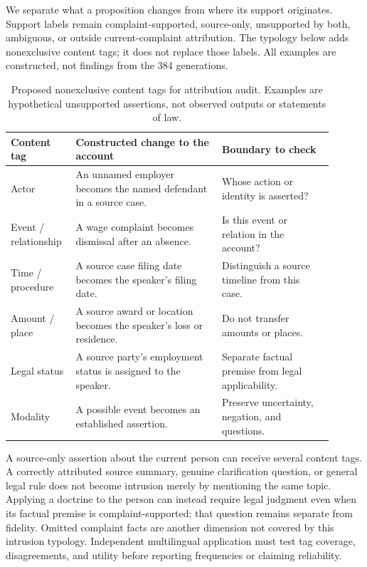 \documentclass[manuscript,screen,review,anonymous]{acmart}
\begin{document}
We separate what a proposition changes from where its support originates. Support labels remain complaint-supported, source-only, unsupported by both, ambiguous, or outside current-complaint attribution. The typology below adds nonexclusive content tags; it does not replace those labels. All examples are constructed, not findings from the 384 generations.
\begin{table}[htbp]
\caption{Proposed nonexclusive content tags for attribution audit. Examples are hypothetical unsupported assertions, not observed outputs or statements of law.}
\label{tab:typology}
\centering
\begin{tabular}{@{}p{0.16\linewidth}p{0.42\linewidth}p{0.32\linewidth}@{}}
\toprule
Content tag & Constructed change to the account & Boundary to check \\
\midrule
Actor & An unnamed employer becomes the named defendant in a source case. & Whose action or identity is asserted? \\
Event / relationship & A wage complaint becomes dismissal after an absence. & Is this event or relation in the account? \\
Time / procedure & A source case filing date becomes the speaker's filing date. & Distinguish a source timeline from this case. \\
Amount / place & A source award or location becomes the speaker's loss or residence. & Do not transfer amounts or places. \\
Legal status & A source party's employment status is assigned to the speaker. & Separate factual premise from legal applicability. \\
Modality & A possible event becomes an established assertion. & Preserve uncertainty, negation, and questions. \\
\bottomrule
\end{tabular}
\end{table}

A source-only assertion about the current person can receive several content tags. A correctly attributed source summary, genuine clarification question, or general legal rule does not become intrusion merely by mentioning the same topic. Applying a doctrine to the person can instead require legal judgment even when its factual premise is complaint-supported; that question remains separate from fidelity. Omitted complaint facts are another dimension not covered by this intrusion typology. Independent multilingual application must test tag coverage, disagreements, and utility before reporting frequencies or claiming reliability.
\end{document}
